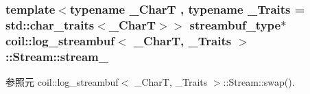 \subsubsection[{stream\_\-}]{\setlength{\rightskip}{0pt plus 5cm}template$<$typename \_\-CharT , typename \_\-Traits  = std::char\_\-traits$<$\_\-CharT$>$$>$ {\bf streambuf\_\-type}$\ast$ {\bf coil::log\_\-streambuf}$<$ \_\-CharT, \_\-Traits $>$::{\bf Stream::stream\_\-}}\label{structcoil_1_1log__streambuf_1_1Stream_a1f4114e35d655390b004ccb0cad39039}


参照元 coil::log\_\-streambuf$<$ \_\-CharT, \_\-Traits $>$::Stream::swap().

